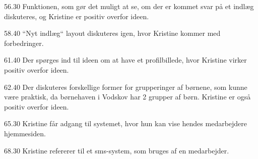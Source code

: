56.30
Funktionen, som gør det muligt at se, om der er kommet svar på et indlæg diskuteres, og Kristine er positiv overfor ideen. 

58.40
``Nyt indlæg`` layout diskuteres igen, hvor Kristine kommer med forbedringer.

61.40
Der spørges ind til ideen om at have et profilbillede, hvor Kristine virker positiv overfor ideen. 

62.40
Der diskuteres forskellige former for grupperinger af børnene, som kunne være praktisk, da børnehaven i Vodskov har 2 grupper af børn. Kristine er også positiv overfor ideen.

65.30
Kristine får adgang til systemet, hvor hun kan vise hendes medarbejdere hjemmesiden.

68.30
Kristine refererer til et sms-system, som bruges af en medarbejder.
